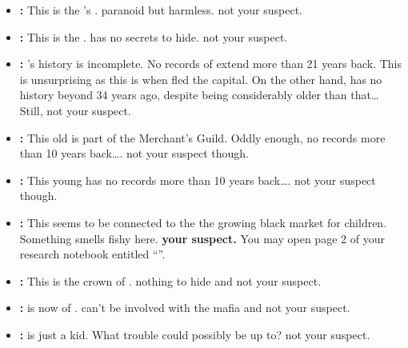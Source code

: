 \documentclass[green]{NeptuneBall}
\begin{document}
\begin{itemize}
	\item \textbf{\cPlant{\full}:} This is the \cKing{\King}'s \cPlant{\sibling}. \cPlant{\They} \cPlant{\are} paranoid but harmless. \cPlant{\They} \cPlant{\are} not your suspect.
	
	\item \textbf{\cKing{\full}:} This is the \cKing{\King}. \cKing{} has no secrets to hide. \cKing{\They} \cKing{\are} not your suspect.
	
	\item  \textbf{\cQueen{\full}:} \cQueen{}'s history is incomplete. No records of \cQueen{\them} extend more than 21 years back. This is unsurprising as this is when \cQueen{\they} fled the capital. On the other hand, \cAthena{} has no history beyond 34 years ago, despite being considerably older than that\ldots{} Still, \cQueen{\they} \cQueen{\are} not your suspect.
	
	\item \textbf{\cSlave{\full}:} This old \cSlave{\mer} is part of the Merchant's Guild. Oddly enough, \cSlave{\they} \cSlave{\have} no records more than 10 years back\ldots{}. \cSlave{\They} \cSlave{\are} not your suspect though.
	
	\item \textbf{\cWitch{\full}:} This young \cWitch{\mer} has no records more than 10 years back\ldots{}. \cWitch{\They} \cWitch{\are} not your suspect though.
	
	\item \textbf{\cPriest{\full}:} This \cPriest{\mer} seems to be connected to the the growing black market for children. Something smells fishy here. {\bf \cPriest{\They} \cPriest{\are} your suspect.} You may open page 2 of your research notebook entitled ``\nMafia{\MYname}''.
	
	\item \textbf{\cPrincess{\full}:} This is the crown \cPrincess{\Prince} of \pAtlantis{}. \cPrincess{\They} \cPrincess{\have} nothing to hide and \cPrincess{\are} not your suspect.
	
	\item \textbf{\cAriel{\full}:} \cAriel{} is now \cAriel{\King} of \pAmerica{}. \cAriel{\They} can't be involved with the mafia and \cAriel{\are} not your suspect.
	
	\item \textbf{\cWillow{\full}:} \cWillow{} is just a kid. What trouble could \cWillow{\they} possibly be up to? \cWillow{\they} \cWillow{\are} not your suspect.
	

\end{itemize}
\end{document}
